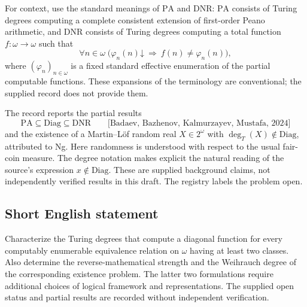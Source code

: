\documentclass[11pt]{article}
\begin{document}
For context, use the standard meanings of \(\mathrm{PA}\) and \(\mathrm{DNR}\): \(\mathrm{PA}\) consists of Turing degrees computing a complete consistent extension of first-order Peano arithmetic, and \(\mathrm{DNR}\) consists of Turing degrees computing a total function \(f:\omega\to\omega\) such that
\[
\forall n\in\omega\;\bigl(\varphi_n(n)\mathord\downarrow\ \Longrightarrow\ f(n)\ne\varphi_n(n)\bigr),
\]
where \((\varphi_n)_{n\in\omega}\) is a fixed standard effective enumeration of the partial computable functions. These expansions of the terminology are conventional; the supplied record does not provide them.

The record reports the partial results
\[
\mathrm{PA}\subseteq\mathrm{Diag}\subseteq\mathrm{DNR}
\qquad\text{[Badaev, Bazhenov, Kalmurzayev, Mustafa, 2024]}
\]
and the existence of a Martin--L\"of random real \(X\in2^\omega\) with \(\deg_T(X)\notin\mathrm{Diag}\), attributed to Ng. Here randomness is understood with respect to the usual fair-coin measure. The degree notation makes explicit the natural reading of the source's expression \(x\notin\mathrm{Diag}\). These are supplied background claims, not independently verified results in this draft. The registry labels the problem open.
\subsection{Short English statement}
Characterize the Turing degrees that compute a diagonal function for every computably enumerable equivalence relation on \(\omega\) having at least two classes. Also determine the reverse-mathematical strength and the Weihrauch degree of the corresponding existence problem. The latter two formulations require additional choices of logical framework and representations. The supplied open status and partial results are recorded without independent verification.
\end{document}
